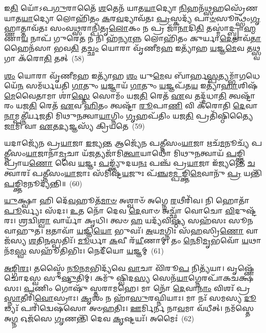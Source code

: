 𑌇\-\ul{𑌤𑌿} 𑌯𑍋᳴\-𑌽𑌪\-\ul{𑌗𑍁}\-𑌰𑌾𑌤𑍈᳴ \ul{𑌶}\-𑌤𑍇𑌨᳴ 𑌯𑌾𑌤\-\ul{𑌯𑌾}\-𑌦𑍍𑌯𑍋 \ul{𑌨𑌿}\-𑌹𑌨᳴\-\ul{𑌥𑍍𑌸}\-𑌹𑌸𑍍𑌰𑍇᳴𑌣 𑌯𑌾𑌤\-\ul{𑌯𑌾}\-𑌦𑍍𑌯𑍋 𑌲𑍋𑌹𑌿᳴𑌤𑌂 \ul{𑌕}\-𑌰\-\ul{𑌵}\-𑌦𑍍𑌯𑌾𑌵᳴𑌤𑌃 \ul{𑌪𑍍𑌰}\-𑌸𑍍𑌕𑌦𑍍𑌯᳴ 𑌪𑌾\-\ul{𑍞}\-𑌸𑍂𑌨𑍍𑌥𑍍𑌸𑌂᳴\-\ul{𑌗𑍃}\-𑌹𑍍𑌣𑌾𑌤𑍍𑌤𑌾𑌵᳴𑌤𑌃 𑌸𑌂𑌵\-\ul{𑌥𑍍𑌸}\-𑌰𑌾𑌨𑍍𑌪𑌿᳴𑌤𑍃\-\ul{𑌲𑍋}\-𑌕𑌂 𑌨 𑌪𑍍𑌰 𑌜𑌾᳴\-\ul{𑌨𑌾}\-𑌦𑌿\-\ul{𑌤𑌿} 𑌤𑌸𑍍𑌮𑌾॑𑌦𑍍𑌬𑍍𑌰𑌾\-\ul{𑌹𑍍𑌮}\-𑌣𑌾\-\ul{𑌯} 𑌨𑌾𑌪᳴ 𑌗𑍁𑌰𑍇\-\ul{𑌤} 𑌨 𑌨𑌿 𑌹᳴\-\ul{𑌨𑍍𑌯𑌾}\-𑌨𑍍𑌨 𑌲𑍋𑌹𑌿᳴𑌤𑌂 𑌕𑍁𑌰𑍍𑌯𑌾\-\ul{𑌦𑍇}\-𑌤𑌾𑌵᳴\-\ul{𑌤𑌾} 𑌹𑍈𑌨᳴𑌸𑌾 𑌭𑌵\-\ul{𑌤𑌿} 𑌤\-\ul{𑌚𑍍𑌛𑌂} 𑌯𑍋𑌰𑌾 𑌵𑍃᳴𑌣𑍀𑌮\-\ul{𑌹} 𑌇𑌤𑍍𑌯𑌾᳴𑌹 \ul{𑌯}\-𑌜𑍍𑌞\-\ul{𑌮𑍇}\-𑌵 𑌤\-\ul{𑌥𑍍𑌸𑍍𑌵}\-𑌗𑌾 𑌕᳴𑌰𑍋\-\ul{𑌤𑌿} 𑌤𑌤𑍍~(58)

\-\ul{𑌶𑌂} 𑌯𑍋𑌰𑌾 𑌵𑍃᳴𑌣𑍀𑌮\-\ul{𑌹} 𑌇𑌤𑍍𑌯𑌾᳴𑌹 \ul{𑌶𑌂} 𑌯𑍁\-\ul{𑌮𑍇}\-𑌵 𑌬𑌾᳴𑌰𑍍\mbox{}𑌹\-\ul{𑌸𑍍𑌪}\-𑌤𑍍𑌯𑌮𑍍𑌭𑌾᳴\-\ul{𑌗}\-𑌧𑍇𑌯𑍇᳴\-\ul{𑌨} 𑌸𑌮᳴𑌰𑍍𑌧𑌯𑌤𑌿 \ul{𑌗𑌾}\-𑌤𑍁𑌂 \ul{𑌯}\-𑌜𑍍𑌞𑌾𑌯᳴ \ul{𑌗𑌾}\-𑌤𑍁𑌂 \ul{𑌯}\-𑌜𑍍𑌞𑌪᳴𑌤\-\ul{𑌯} 𑌇𑌤𑍍𑌯𑌾᳴\-\ul{𑌹𑌾}\-𑌶𑌿𑌷᳴\-\ul{𑌮𑍇}\-𑌵𑍈𑌤𑌾𑌮𑌾 𑌶𑌾॑\-\ul{𑌸𑍍𑌤𑍇} 𑌸𑍋𑌮𑌂᳴ 𑌯𑌜\-\ul{𑌤𑌿} 𑌰𑍇𑌤᳴ \ul{𑌏}\-𑌵 𑌤𑌦𑍍𑌦᳴𑌧𑌾\-\ul{𑌤𑌿} 𑌤𑍍𑌵𑌷𑍍𑌟𑌾᳴𑌰𑌂 𑌯𑌜\-\ul{𑌤𑌿} 𑌰𑍇𑌤᳴ \ul{𑌏}\-𑌵 \ul{𑌹𑌿}\-𑌤𑌂 𑌤𑍍𑌵𑌷𑍍𑌟𑌾᳴ \ul{𑌰𑍂}\-𑌪𑌾\-\ul{𑌣𑌿} 𑌵𑌿 𑌕᳴𑌰𑍋𑌤𑌿 \ul{𑌦𑍇}\-𑌵𑌾\-\ul{𑌨𑌾}\-𑌮𑍍𑌪𑌤𑍍𑌨𑍀॑𑌰𑍍𑌯𑌜𑌤𑌿 𑌮𑌿𑌥𑍁\-\ul{𑌨}\-𑌤𑍍𑌵𑌾\-\ul{𑌯𑌾}\-𑌗𑍍𑌨𑌿𑌂 \ul{𑌗𑍃}\-𑌹𑌪᳴𑌤𑌿𑌂 𑌯𑌜\-\ul{𑌤𑌿} 𑌪𑍍𑌰𑌤𑌿᳴𑌷𑍍𑌠𑌿𑌤𑍍𑌯𑍈 \ul{𑌜𑌾}\-𑌮𑌿 𑌵𑌾 \ul{𑌏}\-𑌤\-\ul{𑌦𑍍𑌯}\-𑌜𑍍𑌞𑌸𑍍𑌯᳴ 𑌕𑍍𑌰𑌿𑌯𑌤𑍇~(59)

𑌯𑌦𑌾𑌜𑍍𑌯𑍇᳴𑌨 𑌪𑍍𑌰\-\ul{𑌯𑌾}\-𑌜𑌾 \ul{𑌇}\-𑌜𑍍𑌯\-\ul{𑌨𑍍𑌤} 𑌆𑌜𑍍𑌯𑍇᳴𑌨 𑌪𑌤𑍍𑌨𑍀𑌸𑌂\-\ul{𑌯𑌾}\-𑌜𑌾 𑌋𑌚᳴\-\ul{𑌮}\-𑌨𑍂𑌚𑍍𑌯᳴ 𑌪𑌤𑍍𑌨𑍀𑌸𑌂\-\ul{𑌯𑌾}\-𑌜𑌾𑌨𑌾᳴\-\ul{𑌮𑍃}\-𑌚𑌾 𑌯᳴\-\ul{𑌜}\-𑌤𑍍𑌯𑌜𑌾᳴𑌮𑌿\-\ul{𑌤𑍍𑌵𑌾}\-𑌯𑌾𑌥𑍋᳴ 𑌮𑌿𑌥𑍁\-\ul{𑌨}\-𑌤𑍍𑌵𑌾𑌯᳴ \ul{𑌪}\-𑌙𑍍𑌕𑍍𑌤𑌿𑌪𑍍𑌰𑌾᳴𑌯\-\ul{𑌣𑍋} 𑌵𑍈 \ul{𑌯}\-𑌜𑍍𑌞𑌃 \ul{𑌪}\-𑌙𑍍𑌕𑍍𑌤𑍍𑌯𑍁᳴𑌦𑌯\-\ul{𑌨𑌃} 𑌪𑌞𑍍𑌚᳴ 𑌪𑍍𑌰\-\ul{𑌯𑌾}\-𑌜𑌾 𑌇᳴𑌜𑍍𑌯𑌨𑍍𑌤𑍇 \ul{𑌚}\-𑌤𑍍𑌵𑌾𑌰𑌃᳴ 𑌪𑌤𑍍𑌨𑍀𑌸𑌂\-\ul{𑌯𑌾}\-𑌜𑌾𑌃 𑌸᳴𑌮𑌿𑌷𑍍𑌟\-\ul{𑌯}\-𑌜𑍁𑌃 𑌪᳴\-\ul{𑌞𑍍𑌚}\-𑌮\-\ul{𑌮𑍍𑌪}\-𑌙𑍍𑌕𑍍𑌤𑌿\-\ul{𑌮𑍇}\-𑌵𑌾𑌨𑍁᳴ \ul{𑌪𑍍𑌰} 𑌯𑌨𑍍𑌤𑌿᳴ \ul{𑌪}\-𑌙𑍍𑌕𑍍𑌤𑌿𑌮𑌨𑍂𑌦𑍍𑌯᳴𑌨𑍍𑌤𑌿॥~(60)

{\anuvakamend[{\-\ul{𑌪𑍍𑌰}\-𑌜𑌾𑌯𑌾𑌃॑ 𑌕𑌰𑍋\-\ul{𑌤𑌿} 𑌤𑌤𑍍𑌕𑍍𑌰𑌿᳴𑌯\-\ul{𑌤𑍇} 𑌤𑍍𑌰𑌯᳴𑌸𑍍𑌤𑍍𑌰𑌿𑍞𑌶𑌚𑍍𑌚}]}%

\-\ul{𑌯𑍁}\-𑌕𑍍𑌷𑍍𑌵𑌾 𑌹𑌿 𑌦𑍇᳴\-\ul{𑌵}\-𑌹𑍂𑌤᳴\-\ul{𑌮𑌾}\-\-\ul{𑍞} 𑌅𑌶𑍍𑌵𑌾𑍞᳴ 𑌅𑌗𑍍𑌨𑍇 \ul{𑌰}\-𑌥𑍀𑌰𑌿᳴𑌵। 𑌨𑌿 𑌹𑍋𑌤𑌾᳴ \ul{𑌪𑍂}\-𑌰𑍍𑌵𑍍𑌯𑌃 𑌸᳴𑌦𑌃। \ul{𑌉}\-𑌤 𑌨𑍋᳴ 𑌦𑍇𑌵 \ul{𑌦𑍇}\-𑌵𑌾𑍞 𑌅𑌚𑍍𑌛𑌾᳴ 𑌵𑍋𑌚𑍋 \ul{𑌵𑌿}\-𑌦𑍁𑌷𑍍𑌟᳴𑌰𑌃। 𑌶𑍍𑌰𑌦𑍍𑌵𑌿\-\ul{𑌶𑍍𑌵𑌾} 𑌵𑌾𑌰𑍍𑌯𑌾᳴ 𑌕𑍃𑌧𑌿। 𑌤𑍍𑌵𑍞 \ul{𑌹} 𑌯𑌦𑍍𑌯᳴𑌵𑌿\-\ul{𑌷𑍍𑌠𑍍𑌯} 𑌸𑌹᳴𑌸𑌃 𑌸𑍂𑌨𑌵𑌾𑌹𑍁𑌤। \ul{𑌋}\-𑌤𑌾𑌵𑌾᳴ \ul{𑌯}\-𑌜𑍍𑌞𑌿\-\ul{𑌯𑍋} 𑌭𑍁𑌵𑌃᳴। \ul{𑌅}\-𑌯\-\ul{𑌮}\-𑌗𑍍𑌨𑌿𑌃 𑌸᳴\-\ul{𑌹}\-𑌸𑍍𑌰𑌿\-\ul{𑌣𑍋} 𑌵𑌾𑌜᳴𑌸𑍍𑌯 \ul{𑌶}\-𑌤𑌿\-\ul{𑌨}\-𑌸𑍍𑌪𑌤𑌿𑌃᳴। \ul{𑌮𑍂}\-𑌰𑍍𑌧𑌾 \ul{𑌕}\-𑌵𑍀 𑌰᳴\-\ul{𑌯𑍀}\-𑌣𑌾𑌮𑍍। 𑌤𑌂 \ul{𑌨𑍇}\-𑌮𑌿\-\ul{𑌮𑍃}\-𑌭𑌵𑍋᳴ \ul{𑌯}\-𑌥𑌾 𑌨᳴𑌮\-\ul{𑌸𑍍𑌵} 𑌸𑌹𑍂᳴𑌤𑌿𑌭𑌿𑌃। 𑌨𑍇𑌦𑍀᳴𑌯𑍋 \ul{𑌯}\-𑌜𑍍𑌞𑌮𑍍~(61)

\-\ul{𑌅}\-\-\ul{𑌙𑍍𑌗𑌿}\-\-\ul{𑌰𑌃}\-। 𑌤𑌸𑍍𑌮𑍈᳴ \ul{𑌨𑍂}\-𑌨\-\ul{𑌮}\-𑌭𑌿𑌦𑍍𑌯᳴𑌵𑍇 \ul{𑌵𑌾}\-𑌚𑌾 𑌵𑌿᳴𑌰𑍂\-\ul{𑌪} 𑌨𑌿𑌤𑍍𑌯᳴𑌯𑌾। 𑌵𑍃𑌷𑍍𑌣𑍇᳴ 𑌚𑍋𑌦𑌸𑍍𑌵 𑌸𑍁\-\ul{𑌷𑍍𑌟𑍁}\-𑌤𑌿𑌮𑍍। 𑌕𑌮𑍁᳴ 𑌷𑍍𑌵𑌿𑌦\-\ul{𑌸𑍍𑌯} 𑌸𑍇𑌨᳴\-\ul{𑌯𑌾}\-𑌗𑍍𑌨𑍇𑌰𑌪𑌾᳴𑌕𑌚𑌕𑍍𑌷𑌸𑌃। \ul{𑌪}\-𑌣𑌿𑌂 𑌗𑍋𑌷𑍁᳴ 𑌸𑍍𑌤𑌰𑌾𑌮𑌹𑍇। 𑌮𑌾 𑌨𑍋᳴ \ul{𑌦𑍇}\-𑌵𑌾\-\ul{𑌨𑌾𑌂} 𑌵𑌿𑌶𑌃᳴ 𑌪𑍍𑌰\-\ul{𑌸𑍍𑌨𑌾}\-𑌤𑍀𑌰𑌿᳴\-\ul{𑌵𑍋}\-𑌸𑍍𑌰𑌾𑌃। \ul{𑌕𑍃}\-𑌶𑌂 𑌨 𑌹𑌾᳴\-\ul{𑌸𑍁}\-𑌰𑌘𑍍𑌨𑌿᳴𑌯𑌾𑌃। 𑌮𑌾 𑌨𑌃᳴ 𑌸𑌮𑌸𑍍𑌯 \ul{𑌦𑍂}\-𑌢𑍍𑌯𑌃᳴ 𑌪𑌰𑌿᳴𑌦𑍍𑌵𑍇𑌷𑌸𑍋 𑌅𑍞\-\ul{𑌹}\-𑌤𑌿𑌃। \ul{𑌊}\-𑌰𑍍𑌮𑌿𑌰𑍍𑌨 𑌨𑌾\-\ul{𑌵}\-𑌮𑌾 𑌵᳴𑌧𑍀𑌤𑍍। 𑌨𑌮᳴𑌸𑍍𑌤𑍇 𑌅\-\ul{𑌗𑍍𑌨} 𑌓𑌜᳴𑌸𑍇 \ul{𑌗𑍃}\-𑌣𑌨𑍍𑌤𑌿᳴ 𑌦𑍇𑌵 \ul{𑌕𑍃}\-𑌷𑍍𑌟𑌯𑌃᳴। 𑌅𑌮𑍈𑌃॑~(62)

